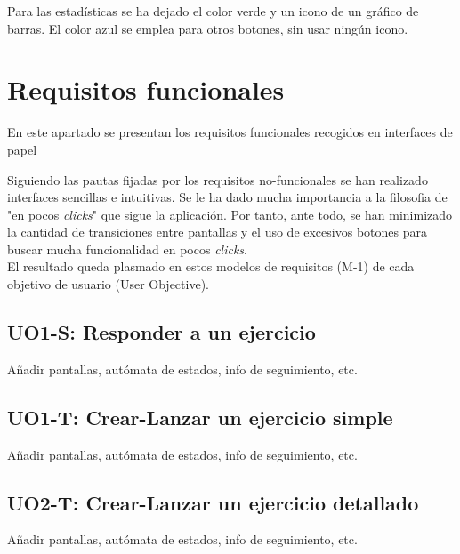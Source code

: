 Para las estadísticas se ha dejado el color verde y un icono de un gráfico de barras. El color azul se emplea para otros botones, sin usar ningún icono.\\

\section{Requisitos funcionales}
\label{analisis-de-requisitos:funcionales}

En este apartado se presentan los requisitos funcionales recogidos en interfaces de papel

Siguiendo las pautas fijadas por los requisitos no-funcionales se han realizado interfaces sencillas e intuitivas. Se le ha dado mucha importancia a la filosofia de "en pocos \textit{clicks}" que sigue la aplicación. Por tanto, ante todo, se han minimizado la cantidad de transiciones entre pantallas y el uso de excesivos botones para buscar mucha funcionalidad en pocos \textit{clicks}.\\

El resultado queda plasmado en estos modelos de requisitos (M-1) de cada objetivo de usuario (User Objective).\\

\subsection{UO1-S: Responder a un ejercicio}
\label{analisis-de-requisitos:funcionales:uo1s}

Añadir pantallas, autómata de estados, info de seguimiento, etc.\\

\subsection{UO1-T: Crear-Lanzar un ejercicio simple}
\label{analisis-de-requisitos:funcionales:uo1t}

Añadir pantallas, autómata de estados, info de seguimiento, etc.\\

\subsection{UO2-T: Crear-Lanzar un ejercicio detallado}
\label{analisis-de-requisitos:funcionales:uo2t}

Añadir pantallas, autómata de estados, info de seguimiento, etc.\\

